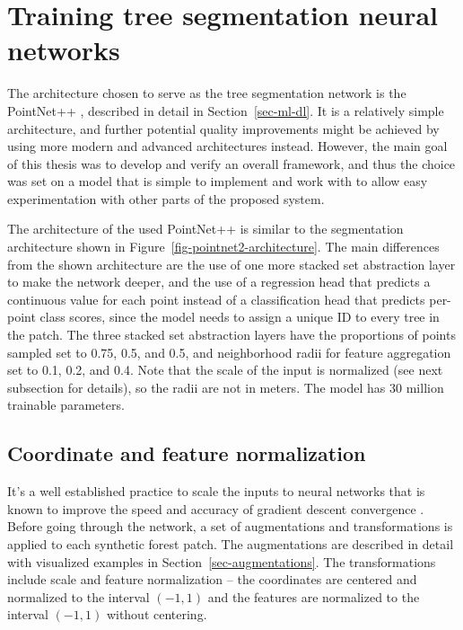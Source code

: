 \section{Training tree segmentation neural networks}

The architecture chosen to serve as the tree segmentation network is the PointNet++ \citep{qiPointNetPlusPlus2017}, described in detail in Section~\ref{sec-ml-dl}.
It is a relatively simple architecture, and further potential quality improvements might be achieved by using more modern and advanced architectures instead.
However, the main goal of this thesis was to develop and verify an overall framework, and thus the choice was set on a model that is simple to implement and work with to allow easy experimentation with other parts of the proposed system.

The architecture of the used PointNet++ is similar to the segmentation architecture shown in Figure~\ref{fig-pointnet2-architecture}.
The main differences from the shown architecture are the use of one more stacked set abstraction layer to make the network deeper, and the use of a regression head that predicts a continuous value for each point instead of a classification head that predicts per-point class scores, since the model needs to assign a unique ID to every tree in the patch.
The three stacked set abstraction layers have the proportions of points sampled set to 0.75, 0.5, and 0.5, and neighborhood radii for feature aggregation set to 0.1, 0.2, and 0.4.
Note that the scale of the input is normalized (see next subsection for details), so the radii are not in meters.
The model has 30 million trainable parameters.

\subsection{Coordinate and feature normalization}

It's a well established practice to scale the inputs to neural networks that is known to improve the speed and accuracy of gradient descent convergence \citep{bishop2006pattern}.
Before going through the network, a set of augmentations and transformations is applied to each synthetic forest patch.
The augmentations are described in detail with visualized examples in Section~\ref{sec-augmentations}.
The transformations include scale and feature normalization – the coordinates are centered and normalized to the interval $(-1, 1)$ and the features are normalized to the interval $(-1, 1)$ without centering.

